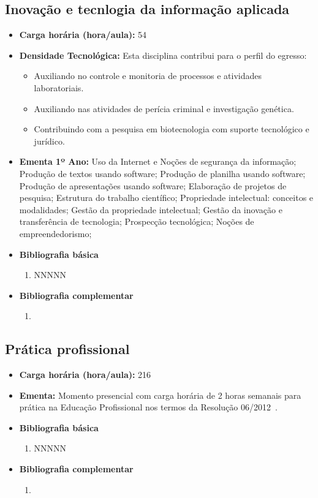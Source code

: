 \documentclass[11pt,fleqn]{book} %
\begin{document}
\newpage
\subsection{Inovação e tecnlogia da informação aplicada}\label{disc:info}
\begin{itemize}
	\item \textbf{Carga horária (hora/aula):} 54
	\item \textbf{Densidade Tecnológica:} Esta disciplina contribui para o perfil do egresso:
	\begin{itemize}
		\item Auxiliando no controle e monitoria de processos e atividades laboratoriais.
		\item Auxiliando nas atividades de perícia criminal e investigação genética.
		\item Contribuindo com a pesquisa em biotecnologia com suporte tecnológico e jurídico.
	\end{itemize}
	\item \textbf{Ementa 1º Ano:}		
	Uso da Internet e Noções de segurança da informação;
	Produção de textos usando software;
	Produção de planilha usando software;
	Produção de apresentações usando software;
	Elaboração de projetos de pesquisa; 
	Estrutura do trabalho científico;
	Propriedade intelectual: conceitos e modalidades;
	Gestão da propriedade intelectual;
	Gestão da inovação e transferência de tecnologia;
	Prospecção tecnológica;
	Noções de empreendedorismo;
	\item \textbf{Bibliografia básica}
	\begin{enumerate}
		\item NNNNN
	\end{enumerate}
	\item \textbf{Bibliografia complementar}
	\begin{enumerate}
		\item 
	\end{enumerate}	
\end{itemize}

\newpage
\subsection{Prática profissional}\label{disc:pratica}
\indent
\begin{itemize}
	\item \textbf{Carga horária (hora/aula):} 216
	\item \textbf{Ementa:} Momento presencial com carga horária de 2 horas semanais para prática na Educação Profissional nos termos da Resolução 06/2012~\cite{Resolucao06De2012}.
	\item \textbf{Bibliografia básica}
	\begin{enumerate}
		\item NNNNN
	\end{enumerate}
	\item \textbf{Bibliografia complementar}
	\begin{enumerate}
		\item 
	\end{enumerate}	
\end{itemize}
\end{document}
